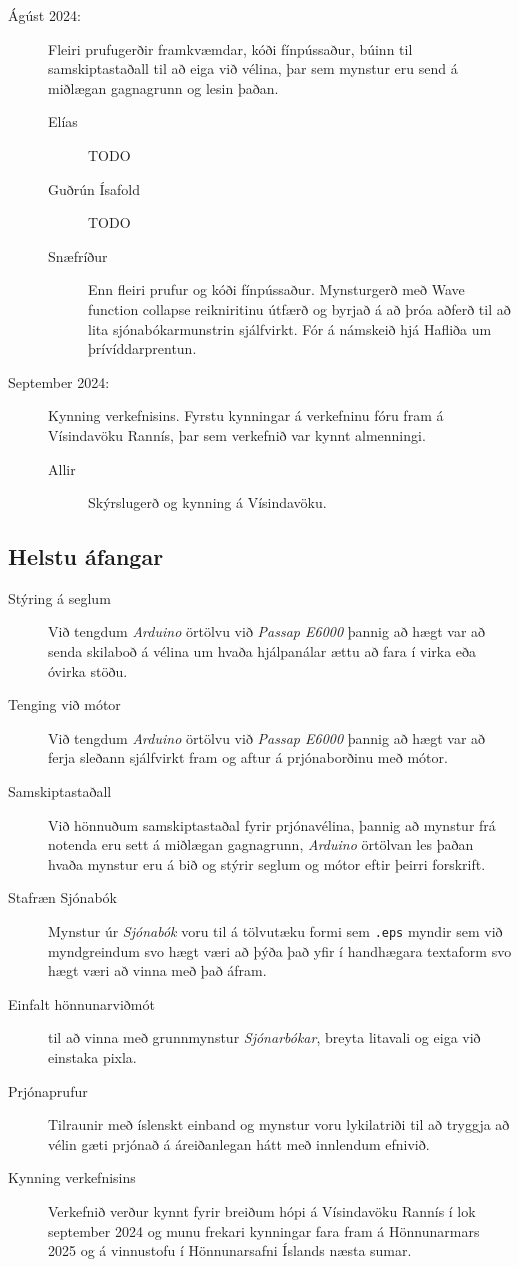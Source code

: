 \documentclass[a4paper,12pt,twoside]{article}
\begin{document}
\begin{description}
\begin{description}
    \end{description}
    \item[Ágúst 2024:] Fleiri prufugerðir framkvæmdar, kóði fínpússaður, búinn til samskiptastaðall til að eiga við vélina, þar sem mynstur eru send á miðlægan gagnagrunn og lesin þaðan.
    \begin{description}
        \item[Elías] TODO 
        \item[Guðrún Ísafold] TODO
       \item[Snæfríður] Enn fleiri prufur og kóði fínpússaður. Mynsturgerð með Wave function collapse reikniritinu útfærð og byrjað á að þróa aðferð til að lita sjónabókarmunstrin sjálfvirkt. Fór á námskeið hjá Hafliða um þrívíddarprentun.
    \end{description}
    \item[September 2024:] Kynning verkefnisins. Fyrstu kynningar á verkefninu fóru fram á Vísindavöku Rannís, þar sem verkefnið var kynnt almenningi. 
    \begin{description}
        \item[Allir] Skýrslugerð og kynning á Vísindavöku.
    \end{description}
\end{description}

\subsection{Helstu áfangar}
\begin{description}
    \item [Stýring á seglum] Við tengdum \textit{Arduino} örtölvu við \textit{Passap E6000} þannig að hægt var að senda skilaboð á vélina um hvaða hjálpanálar ættu að fara í virka eða óvirka stöðu. 
    \item [Tenging við mótor] Við tengdum \textit{Arduino} örtölvu við \textit{Passap E6000} þannig að hægt var að ferja sleðann sjálfvirkt fram og aftur á prjónaborðinu með mótor. 
    \item [Samskiptastaðall] Við hönnuðum samskiptastaðal fyrir prjónavélina, þannig að mynstur frá notenda eru sett á miðlægan gagnagrunn, \textit{Arduino} örtölvan les þaðan hvaða mynstur eru á bið og stýrir seglum og mótor eftir þeirri forskrift. 
    \item [Stafræn Sjónabók] Mynstur úr \textit{Sjónabók} voru til á tölvutæku formi sem \texttt{.eps} myndir sem við myndgreindum svo hægt væri að þýða það yfir í handhægara textaform svo hægt væri að vinna með það áfram. 
    \item [Einfalt hönnunarviðmót] til að vinna með grunnmynstur \textit{Sjónarbókar}, breyta litavali og eiga við einstaka pixla.
    \item [Prjónaprufur] Tilraunir með íslenskt einband og mynstur voru lykilatriði til að tryggja að vélin gæti prjónað á áreiðanlegan hátt með innlendum efnivið.
    \item [Kynning verkefnisins] Verkefnið verður kynnt fyrir breiðum hópi á Vísindavöku Rannís í lok september 2024 og munu frekari kynningar fara fram á Hönnunarmars 2025 og á vinnustofu í Hönnunarsafni Íslands næsta sumar.
\end{description}
\end{document}
